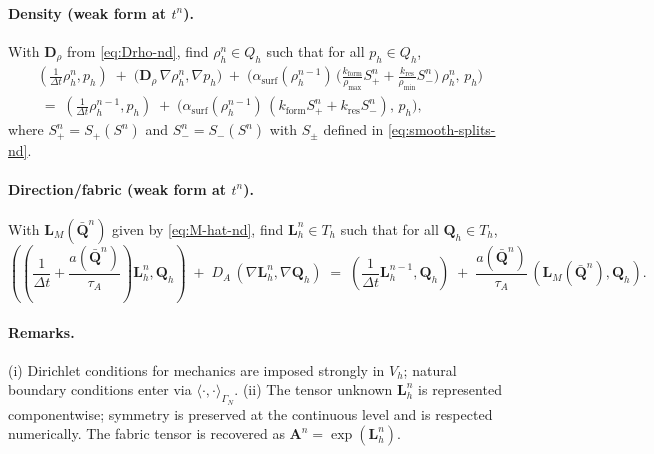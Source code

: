\paragraph{Density (weak form at $t^n$).}
With $\mathbf{D}_\rho$ from \eqref{eq:Drho-nd}, find $\rho_h^{n}\in Q_h$ such that for all $p_h\in Q_h$,
\begin{equation}\label{eq:fe-rho-unified}
\begin{aligned}
\left(\frac{1}{\Delta t}\rho_h^{n}, p_h\right) \;+\; \big(\mathbf{D}_\rho\,\nabla \rho_h^{n}, \nabla p_h\big)
\;+\; \Big(\alpha_{\mathrm{surf}}(\rho_h^{n-1})\,\big(\tfrac{k_{\mathrm{form}}}{\rho_{\max}} S_+^n + \tfrac{k_{\mathrm{res}}}{\rho_{\min}} S_-^n\big)\,\rho_h^{n},\, p_h\Big) \\
\;=\; \left(\frac{1}{\Delta t}\rho_h^{n-1}, p_h\right) \;+\; \Big(\alpha_{\mathrm{surf}}(\rho_h^{n-1})\,(k_{\mathrm{form}} S_+^n + k_{\mathrm{res}} S_-^n),\, p_h\Big),
\end{aligned}
\end{equation}
where $S_+^n = S_+(S^n)$ and $S_-^n = S_-(S^n)$ with $S_\pm$ defined in \eqref{eq:smooth-splits-nd}.

\paragraph{Direction/fabric (weak form at $t^n$).}
With $\mathbf{L}_M(\bar{\mathbf{Q}}^{n})$ given by \eqref{eq:M-hat-nd}, find $\mathbf{L}_h^{n}\in T_h$ such that for all $\mathbf{Q}_h\in T_h$,
\begin{equation}\label{eq:fe-A-unified}
\left(\left(\frac{1}{\Delta t} + \frac{a(\bar{\mathbf{Q}}^{n})}{\tau_A}\right)\mathbf{L}_h^{n}, \mathbf{Q}_h\right) \;+\; D_A\,(\nabla \mathbf{L}_h^{n}, \nabla \mathbf{Q}_h)
\;=\; \left(\frac{1}{\Delta t}\mathbf{L}_h^{n-1}, \mathbf{Q}_h\right) \;+\; \frac{a(\bar{\mathbf{Q}}^{n})}{\tau_A}\,(\mathbf{L}_M(\bar{\mathbf{Q}}^{n}), \mathbf{Q}_h).
\end{equation}

\paragraph{Remarks.}
(i) Dirichlet conditions for mechanics are imposed strongly in $V_h$; natural boundary conditions enter via $\langle\cdot,\cdot\rangle_{\Gamma_N}$. (ii) The tensor unknown $\mathbf{L}_h^{n}$ is represented componentwise; symmetry is preserved at the continuous level and is respected numerically. The fabric tensor is recovered as $\mathbf{A}^n = \exp(\mathbf{L}_h^n)$.
